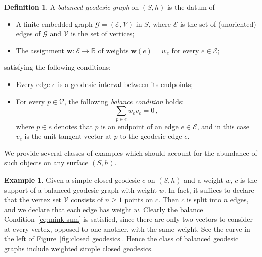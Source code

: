 \documentclass[11pt]{article}
\theoremstyle{definition}
\newtheorem{defi}[theo]{Definition}
\newtheorem{exam}[theo]{Example}
\numberwithin{equation}{section}
\numberwithin{figure}{section}
\numberwithin{table}{section}
\newcommand{\E}{\mathcal{E}}
\newcommand{\R}{{\mathbb R}}
\begin{document}
\begin{defi}\label{defi geod graph}
A \emph{balanced geodesic graph} on $(S,h)$ is the datum of
\begin{itemize}
\item A finite embedded graph $\mathcal{G}=(\mathcal E,\mathcal V)$ in $S$, where $\mathcal E$ is the set of (unoriented) edges of $\mathcal{G}$ and $\mathcal V$ is the set of vertices;
\item The assignment $\mathbf w:\E\to\R$ of weights $\mathbf w(e)=w_e$ for every $e\in\mathcal E$;
\end{itemize}
satisfying the following conditions:
\begin{itemize}
\item Every edge $e$ is a geodesic interval between its endpoints;
\item For every $p\in\mathcal V$, the following \emph{balance condition} holds:
\begin{equation}\label{eq:mink sum}
{\sum_{p\in e} w_{e} v_{e}}=0\,,
\end{equation}
where $p\in e$ denotes that $p$ is an endpoint of an edge $e\in \E$, and in this case $v_{e}$ is the unit tangent vector at $p$ to the geodesic edge $e$.
\end{itemize}
\end{defi}

We provide several classes of examples which should account for the abundance of such objects on any surface $(S,h)$.

\begin{exam}\label{example simple closed geo}
Given a simple closed geodesic $c$ on $(S,h)$ and a weight $w$, $c$ is the support of a balanced geodesic graph with weight $w$. In fact, it suffices to declare that the vertex set $\mathcal V$ consists of $n\geq 1$ points on $c$. Then $c$ is split into $n$ edges, and we declare that each edge has weight $w$. Clearly the balance Condition~\eqref{eq:mink sum} is satisfied, since there are only two vectors to consider at every vertex, opposed to one another, with the same weight. See the curve in the left of Figure~\ref{fig:closed geodesics}. Hence the class of balanced geodesic graphs include weighted simple closed geodesics.
\end{exam}
\end{document}
